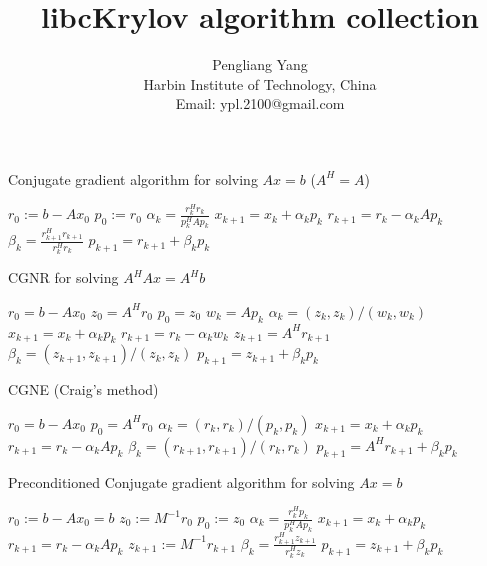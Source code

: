 \documentclass[10pt]{article}
\title{libcKrylov algorithm collection}
\author{Pengliang Yang\\
  Harbin Institute of Technology, China\\
Email: ypl.2100@gmail.com}
\begin{document}
\maketitle


\begin{algorithm}[H]
  \caption{Conjugate gradient algorithm for solving $Ax=b$ ($A^H=A$) \citep{Shewchuk_1994_ICG}}\label{alg:CG}
  \begin{algorithmic}[1]
  \State $r_0:=b-A x_0$
  \State $p_0:=r_0$
    \State $\alpha_k=\frac{r_k^H r_k}{p_k^H Ap_k}$
    \State $x_{k+1}=x_k + \alpha_k p_k$
    \State $r_{k+1}=r_k - \alpha_k A p_k$
    \State $\beta_{k} = \frac{r_{k+1}^H r_{k+1}}{r_k^H r_k}$\;
    \State $p_{k+1}=r_{k+1} + \beta_k p_k$\;
    \EndFor
  \end{algorithmic}
\end{algorithm}

\begin{algorithm}[H]
  \caption{CGNR for solving $A^H Ax=A^H b$ \citep[algorithm 8.4]{Saad_2003_IMS}}
  \begin{algorithmic}[1]
    \State $r_0=b-Ax_0$
    \State $z_0 = A^H r_0$
    \State $p_0=z_0$
    \State $w_k=Ap_k$
    \State $\alpha_k = (z_k,z_k)/(w_k,w_k)$
    \State $x_{k+1} = x_k + \alpha_k  p_k$
    \State $r_{k+1} = r_k-\alpha_k w_k$
    \State $z_{k+1}=A^H r_{k+1}$
    \State $\beta_k = (z_{k+1},z_{k+1})/(z_k,z_k)$
    \State $p_{k+1}=z_{k+1}+\beta_k p_k$
    \EndFor
  \end{algorithmic}
\end{algorithm}

\begin{algorithm}[H]
  \caption{CGNE (Craig's method) \citep[algorithm 8.5]{Saad_2003_IMS}}
  \begin{algorithmic}[1]
    \State $r_0=b-Ax_0$
    \State $p_0 = A^H r_0$
    \State $\alpha_k = (r_k , r_k)/(p_k, p_k )$
    \State $x_{k+1} = x_k + \alpha_k  p_k$
    \State $r_{k+1} = r_k-\alpha_k Ap_k$
    \State $\beta_k = (r_{k+1},r_{k+1})/(r_k,r_k)$
    \State $p_{k+1}=A^H r_{k+1}+\beta_k p_k$
    \EndFor
  \end{algorithmic}
\end{algorithm}

\begin{algorithm}[H]
  \caption{Preconditioned Conjugate gradient algorithm for solving $Ax=b$ \citep[algorithm 9.1]{Saad_2003_IMS}}
  \begin{algorithmic}[1]
  \State $r_0:=b-A x_0=b$
  \State $z_0:=M^{-1}r_0$
  \State $p_0:=z_0$
    \State $\alpha_k=\frac{r_k^H p_k}{p_k^H Ap_k}$
    \State $x_{k+1}=x_k + \alpha_k p_k$
    \State $r_{k+1}=r_k - \alpha_k A p_k$
    \State $z_{k+1}:=M^{-1}r_{k+1}$
    \State $\beta_{k} = \frac{r_{k+1}^H z_{k+1}}{r_k^H z_k}$\;
    \State $p_{k+1}=z_{k+1} + \beta_k p_k$\;
    \EndFor
  \end{algorithmic}
\end{algorithm}
\end{document}

